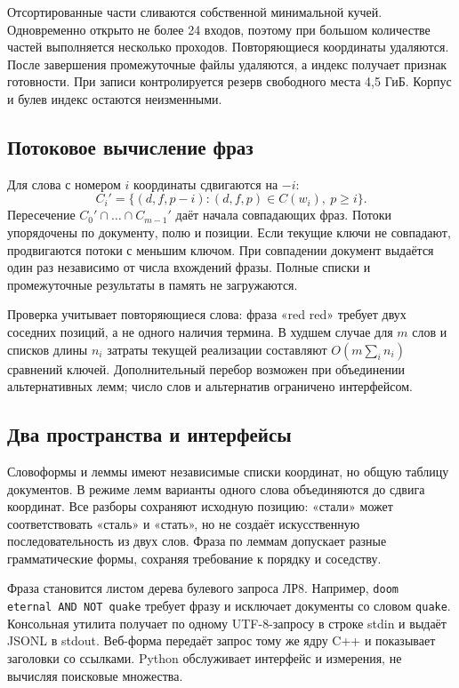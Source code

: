 \documentclass[12pt,a4paper]{article}
\begin{document}
Отсортированные части сливаются собственной минимальной кучей.
Одновременно открыто не более 24 входов, поэтому при большом количестве
частей выполняется несколько проходов. Повторяющиеся координаты удаляются.
После завершения промежуточные файлы удаляются, а индекс получает
признак готовности. При записи контролируется резерв свободного места
4,5 ГиБ. Корпус и булев индекс остаются неизменными.

\subsection{Потоковое вычисление фраз}
Для слова с номером $i$ координаты сдвигаются на $-i$:
\[
C_i'=\{(d,f,p-i):(d,f,p)\in C(w_i),\ p\geq i\}.
\]
Пересечение $C_0'\cap\ldots\cap C_{m-1}'$ даёт начала совпадающих фраз.
Потоки упорядочены по документу, полю и позиции. Если текущие ключи
не совпадают, продвигаются потоки с меньшим ключом.
При совпадении документ выдаётся один раз независимо от числа
вхождений фразы. Полные списки и промежуточные результаты
в память не загружаются.

Проверка учитывает повторяющиеся слова: фраза «red red» требует
двух соседних позиций, а не одного наличия термина.
В худшем случае для $m$ слов и списков длины $n_i$ затраты текущей
реализации составляют $O(m\sum_i n_i)$ сравнений ключей.
Дополнительный перебор возможен при объединении альтернативных лемм;
число слов и альтернатив ограничено интерфейсом.

\subsection{Два пространства и интерфейсы}
Словоформы и леммы имеют независимые списки координат,
но общую таблицу документов. В режиме лемм варианты одного
слова объединяются до сдвига координат. Все разборы сохраняют
исходную позицию: «стали» может соответствовать «сталь» и «стать»,
но не создаёт искусственную последовательность из двух слов.
Фраза по леммам допускает разные грамматические формы,
сохраняя требование к порядку и соседству.

Фраза становится листом дерева булевого запроса ЛР8.
Например, \texttt{\textquotedbl doom eternal\textquotedbl\ AND NOT quake}
требует фразу и исключает документы со словом \texttt{quake}.
Консольная утилита получает по одному UTF-8-запросу в строке stdin
и выдаёт JSONL в stdout. Веб-форма передаёт запрос тому же ядру C++
и показывает заголовки со ссылками. Python обслуживает интерфейс
и измерения, не вычисляя поисковые множества.
\end{document}
